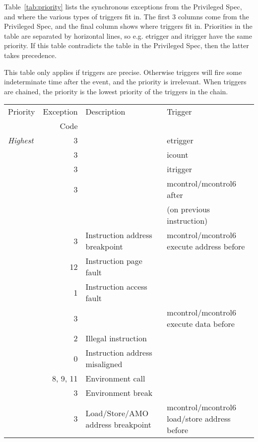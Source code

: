 Table~\ref{tab:priority} lists the synchronous exceptions from the Privileged
Spec, and where the various types of triggers fit in. The first 3 columns come
from the Privileged Spec, and the final column shows where triggers fit in.
Priorities in the table are separated by horizontal lines, so e.g. etrigger and
itrigger have the same priority.
If this table contradicts the table in the Privileged Spec, then the latter
takes precedence.

This table only applies if triggers are precise. Otherwise triggers
will fire some indeterminate time after the event, and the priority is
irrelevant.
When triggers are chained, the priority is the lowest priority of the triggers
in the chain.

\begin{table}[H]
\centering
\begin{tabular}{|l|r|l|l|}
  \hline
  Priority      & Exception & Description & Trigger \\
                &      Code &             & \\
  \hline
  {\em Highest} &          3 & & etrigger \\
                &          3 & & icount \\
                &          3 & & itrigger \\
                &          3 & & mcontrol/mcontrol6 after \\
                &            & & \hspace{2em}(on previous instruction) \\
                \hline
                &          3 & Instruction address breakpoint & mcontrol/mcontrol6 execute address before \\ \hline
                &         12 & Instruction page fault & \\ \hline
                &          1 & Instruction access fault & \\ \hline
                &          3 & & mcontrol/mcontrol6 execute data before \\ \hline
                &          2 & Illegal instruction & \\
                &          0 & Instruction address misaligned & \\
                &   8, 9, 11 & Environment call & \\
                &          3 & Environment break & \\
                &          3 & Load/Store/AMO address breakpoint & mcontrol/mcontrol6 load/store address before \\

\end{tabular}
\end{table}
